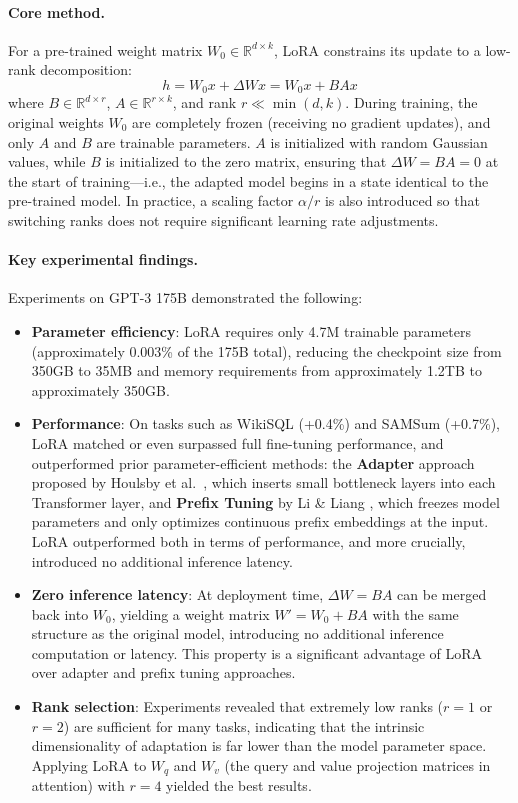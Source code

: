 \paragraph{Core method.}
For a pre-trained weight matrix $W_0 \in \mathbb{R}^{d \times k}$,
LoRA constrains its update to a low-rank decomposition:
\begin{equation}
h = W_0 x + \Delta W x = W_0 x + B A x
\label{eq:lora}
\end{equation}
where $B \in \mathbb{R}^{d \times r}$, $A \in \mathbb{R}^{r \times k}$,
and rank $r \ll \min(d, k)$.
During training, the original weights $W_0$ are completely frozen (receiving no gradient updates),
and only $A$ and $B$ are trainable parameters.
$A$ is initialized with random Gaussian values, while $B$ is initialized to the zero matrix,
ensuring that $\Delta W = BA = 0$ at the start of training---i.e., the adapted model begins in a state identical to the pre-trained model.
In practice, a scaling factor $\alpha / r$ is also introduced so that switching ranks does not require significant learning rate adjustments.

\paragraph{Key experimental findings.}
Experiments on GPT-3 175B demonstrated the following:
\begin{itemize}[leftmargin=2em]
  \item \textbf{Parameter efficiency}:
    LoRA requires only 4.7M trainable parameters (approximately 0.003\% of the 175B total),
    reducing the checkpoint size from 350GB to 35MB and memory requirements from approximately 1.2TB to approximately 350GB.
  \item \textbf{Performance}:
    On tasks such as WikiSQL (+0.4\%) and SAMSum (+0.7\%),
    LoRA matched or even surpassed full fine-tuning performance,
    and outperformed prior parameter-efficient methods:
    the \textbf{Adapter} approach proposed by Houlsby et al.\ \cite{houlsby2019adapters}, which inserts small bottleneck layers into each Transformer layer,
    and \textbf{Prefix Tuning} by Li \& Liang \cite{li2021prefix}, which freezes model parameters and only optimizes continuous prefix embeddings at the input.
    LoRA outperformed both in terms of performance, and more crucially, introduced no additional inference latency.
  \item \textbf{Zero inference latency}:
    At deployment time, $\Delta W = BA$ can be merged back into $W_0$,
    yielding a weight matrix $W' = W_0 + BA$ with the same structure as the original model,
    introducing no additional inference computation or latency.
    This property is a significant advantage of LoRA over adapter and prefix tuning approaches.
  \item \textbf{Rank selection}:
    Experiments revealed that extremely low ranks ($r = 1$ or $r = 2$) are sufficient for many tasks,
    indicating that the intrinsic dimensionality of adaptation is far lower than the model parameter space.
    Applying LoRA to $W_q$ and $W_v$ (the query and value projection matrices in attention)
    with $r = 4$ yielded the best results.
\end{itemize}

